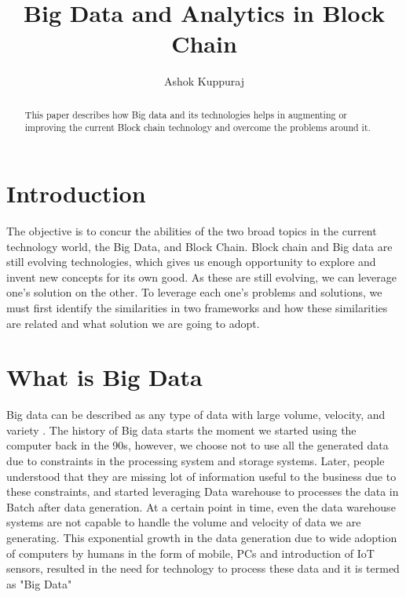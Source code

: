 \documentclass[sigconf]{acmart}
\begin{document}
\title{Big Data and Analytics in Block Chain}


\author{Ashok Kuppuraj}


\renewcommand{\shortauthors}{G. v. Laszewski}


\begin{abstract}
This paper describes how Big data and its technologies helps in augmenting or improving the current Block chain technology and overcome  the problems around it.
\end{abstract}



\maketitle

\section{Introduction}
The objective is to concur the abilities of the two broad topics in the current technology world, the Big Data, and Block Chain. Block chain and Big data are still evolving technologies, which gives us enough opportunity to explore and invent new concepts for its own good. As these are still evolving, we can leverage one's solution on the other.  To leverage each one's problems and solutions, we must first identify the similarities in  two frameworks and how these similarities are related and what solution we are going to adopt. 

\section{What is Big Data}
Big data can be described as any type of data with large volume, velocity, and variety \cite{Bigdataintro}. The history of Big data starts the moment we started using the computer back in the 90s, however, we choose not to use all the generated data due to constraints in the processing system and storage systems. Later, people understood that they are missing lot of information useful to the business due to these constraints, and started leveraging Data warehouse to processes the data in Batch after data generation. At a certain point in time, even the data warehouse systems are not capable to handle the volume and velocity of data we are generating. This exponential growth in the data generation due to wide adoption of computers by humans in the form of mobile, PCs and introduction of IoT sensors, resulted in the need for technology to process these data and it is termed as  "Big Data" \cite{datagrowth}
\end{document}
